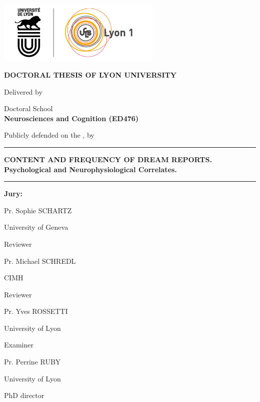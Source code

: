 \begin{titlepage}

  \setlength{\parindent}{0pt}
  \thispagestyle{empty}

  \begin{center}
  \includegraphics[height=3cm]{content/logo}
  \end{center}

  \bigskip

  \begin{center}
  \fontsize{14pt}{16pt}\selectfont
  \textbf{\uppercase{DOCTORAL THESIS OF LYON UNIVERSITY}} \\

  \vspace*{1cm}

  \fontsize{12pt}{14pt}\selectfont
  Delivered by\\ \medskip
  \textbf{\thesisUniversity}

  Doctoral School\\ \medskip
  \textbf{Neurosciences and Cognition (ED476)}


  \vspace*{0.5cm}

  Publicly defended on the \thesisDate, by \\ \medskip
  \fontsize{14pt}{16pt}\selectfont
  \textbf{\thesisName}

  \vspace*{0.5cm}

  \rule{\textwidth}{0.5pt}

  \fontsize{16pt}{20pt}\selectfont
  \textbf{CONTENT AND FREQUENCY OF DREAM REPORTS.\\ \medskip
  Psychological and Neurophysiological Correlates.}
  \rule{\textwidth}{0.5pt}

  \end{center}

  \vspace*{0.5cm}

  \fontsize{12pt}{14pt}\selectfont
  \textbf{Jury:}

  \newcommand\textline[4][t]{%
      \par\noindent\parbox[#1]{.333\textwidth}{\raggedright#2}%
      \parbox[#1]{.333\textwidth}{\centering#3}%
      \parbox[#1]{.333\textwidth}{\raggedleft#4}\par
  }

  \textline[t]{Pr. Sophie SCHARTZ}{University of Geneva}{Reviewer}
  \textline[t]{Pr. Michael SCHREDL}{CIMH}{Reviewer}
  \textline[t]{Pr. Yves ROSSETTI}{University of Lyon}{Examiner}
  \textline[t]{Pr. Perrine RUBY }{University of Lyon}{PhD director}

  \vfill

\end{titlepage}
